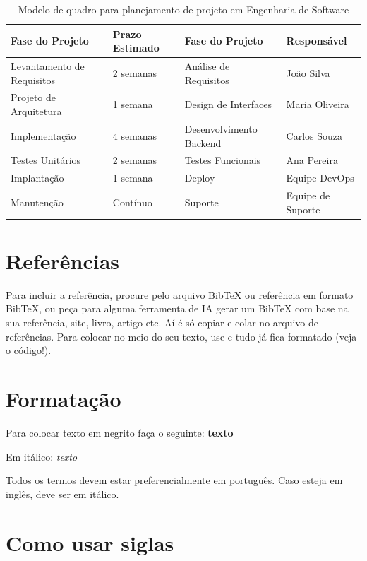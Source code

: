 \begin{table}[!htbp]
    \centering
    \renewcommand{\arraystretch}{1.2}
    \caption{Modelo de quadro para planejamento de projeto em Engenharia de Software}%
    \label{tab:quadro_software}
    \begin{tabular}{| L{4cm} | C{3cm} | L{4cm}  | C{3cm} |}
        \hline
        Fase do Projeto & Prazo Estimado & Fase do Projeto & Responsável \\ 
        \hline
        Levantamento de Requisitos & 2 semanas & Análise de Requisitos & João Silva \\ 
        Projeto de Arquitetura & 1 semana & Design de Interfaces & Maria Oliveira \\ 
        Implementação & 4 semanas & Desenvolvimento Backend & Carlos Souza \\ 
        Testes Unitários & 2 semanas & Testes Funcionais & Ana Pereira \\ 
        Implantação & 1 semana & Deploy & Equipe DevOps \\ 
        Manutenção & Contínuo & Suporte & Equipe de Suporte \\ 
        \hline
    \end{tabular}
    \vspace{2mm}
\end{table}

\section{Referências}

Para incluir a referência, procure pelo arquivo BibTeX ou referência em formato BibTeX, ou peça para alguma ferramenta de IA gerar um BibTeX com base na sua referência, site, livro, artigo etc.  
Aí é só copiar e colar no arquivo de referências.  
Para colocar no meio do seu texto, use \cite{exemplo_livro} e tudo já fica formatado (veja o código!).

\section{Formatação}

Para colocar texto em negrito faça o seguinte: \textbf{texto} 

Em itálico: \textit{texto} 

Todos os termos devem estar preferencialmente em português. Caso esteja em inglês, deve ser em itálico.

\section{Como usar siglas}

